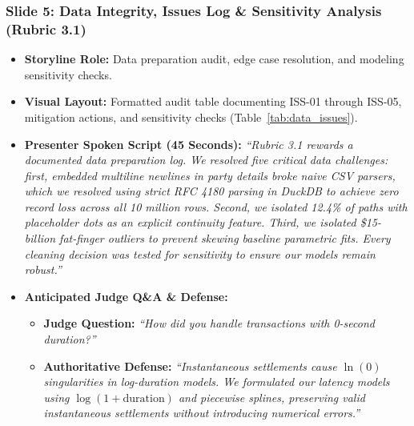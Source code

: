 \documentclass[11pt,a4paper]{article}
\begin{document}
\subsubsection{Slide 5: Data Integrity, Issues Log \& Sensitivity Analysis (Rubric 3.1)}
\begin{itemize}
    \item \textbf{Storyline Role:} Data preparation audit, edge case resolution, and modeling sensitivity checks.
    \item \textbf{Visual Layout:} Formatted audit table documenting ISS-01 through ISS-05, mitigation actions, and sensitivity checks (Table~\ref{tab:data_issues}).
    \item \textbf{Presenter Spoken Script (45 Seconds):}
    \textit{``Rubric 3.1 rewards a documented data preparation log. We resolved five critical data challenges: first, embedded multiline newlines in party details broke naive CSV parsers, which we resolved using strict RFC 4180 parsing in DuckDB to achieve zero record loss across all 10 million rows. Second, we isolated 12.4\% of paths with placeholder dots as an explicit continuity feature. Third, we isolated \$15-billion fat-finger outliers to prevent skewing baseline parametric fits. Every cleaning decision was tested for sensitivity to ensure our models remain robust.''}
    \item \textbf{Anticipated Judge Q\&A \& Defense:}
    \begin{itemize}
        \item \textbf{Judge Question:} \textit{``How did you handle transactions with 0-second duration?''}
        \item \textbf{Authoritative Defense:} \textit{``Instantaneous settlements cause $\ln(0)$ singularities in log-duration models. We formulated our latency models using $\log(1 + \text{duration})$ and piecewise splines, preserving valid instantaneous settlements without introducing numerical errors.''}
    \end{itemize}
\end{itemize}
\end{document}
